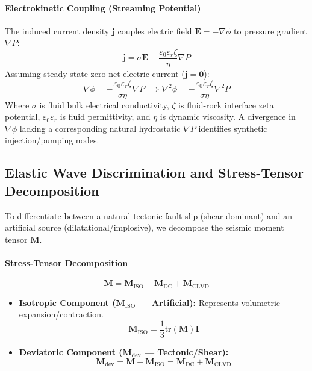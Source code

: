 \documentclass[11pt,a4paper]{article}
\begin{document}
\paragraph{Electrokinetic Coupling (Streaming Potential)}
The induced current density $\mathbf{j}$ couples electric field $\mathbf{E} = -\nabla \phi$ to pressure gradient $\nabla P$:
\begin{equation}
\mathbf{j} = \sigma \mathbf{E} - \frac{\varepsilon_0 \varepsilon_r \zeta}{\eta} \nabla P
\end{equation}
Assuming steady-state zero net electric current ($\mathbf{j} = \mathbf{0}$):
\begin{equation}
\nabla \phi = -\frac{\varepsilon_0 \varepsilon_r \zeta}{\sigma \eta} \nabla P \implies \nabla^2 \phi = -\frac{\varepsilon_0 \varepsilon_r \zeta}{\sigma \eta} \nabla^2 P
\end{equation}
Where $\sigma$ is fluid bulk electrical conductivity, $\zeta$ is fluid-rock interface zeta potential, $\varepsilon_0 \varepsilon_r$ is fluid permittivity, and $\eta$ is dynamic viscosity. A divergence in $\nabla \phi$ lacking a corresponding natural hydrostatic $\nabla P$ identifies synthetic injection/pumping nodes.

\subsection{Elastic Wave Discrimination and Stress-Tensor Decomposition}
To differentiate between a natural tectonic fault slip (shear-dominant) and an artificial source (dilatational/implosive), we decompose the seismic moment tensor $\mathbf{M}$.

\paragraph{Stress-Tensor Decomposition}
\begin{equation}
\mathbf{M} = \mathbf{M}_{\text{ISO}} + \mathbf{M}_{\text{DC}} + \mathbf{M}_{\text{CLVD}}
\end{equation}
\begin{itemize}
    \item \textbf{Isotropic Component ($\mathbf{M}_{\text{ISO}}$ --- Artificial):} Represents volumetric expansion/contraction.
    \begin{equation}
    \mathbf{M}_{\text{ISO}} = \frac{1}{3} \mathrm{tr}(\mathbf{M}) \mathbf{I}
    \end{equation}
    \item \textbf{Deviatoric Component ($\mathbf{M}_{\text{dev}}$ --- Tectonic/Shear):}
    \begin{equation}
    \mathbf{M}_{\text{dev}} = \mathbf{M} - \mathbf{M}_{\text{ISO}} = \mathbf{M}_{\text{DC}} + \mathbf{M}_{\text{CLVD}}
    \end{equation}
\end{itemize}
\end{document}
